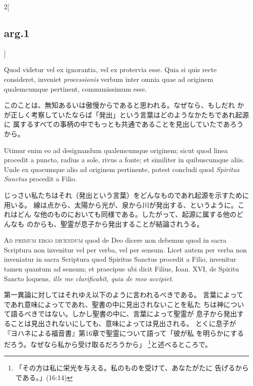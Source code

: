 \documentclass[paper=a4paper,fontsize=10pt,jafontsize=9pt,titlepage]{jlreq}
\begin{document}
\begin{paracol}{2}[\subsection{arg.1}]
\switchcolumn*

Quod videtur vel ex ignorantia, vel ex protervia
esse. Quia si quis recte consideret, inveniet {\itshape processionis} verbum
inter omnia quae ad originem qualemcumque pertinent, communissimum
esse.

\switchcolumn

このことは、無知あるいは傲慢からであると思われる。なぜなら、もしだれ
 かが正しく考察していたならば「発出」という言葉はどのようなかたちであれ起源に
 属するすべての事柄の中でもっとも共通であることを見出していたであろう
 から。

\switchcolumn*

Utimur enim eo ad designandum qualemcumque originem; sicut quod
linea procedit a puncto, radius a sole, rivus a fonte; et similiter in
quibuscumque aliis. Unde ex quocumque alio ad originem pertinente,
potest concludi quod {\itshape  Spiritus Sanctus} procedit a Filio.

\switchcolumn

じっさい私たちはそれ（発出という言葉）をどんなものであれ起源を示すために用いる。
 線は点から、太陽から光が、泉から川が発出する、というように。これはどん
 な他のものにおいても同様である。したがって、起源に属する他のどんなも
 のからも、聖霊が息子から発出することが結論されうる。

\switchcolumn*[\subsection{ad.1}]

{\scshape Ad primum ergo dicendum} quod de Deo dicere non debemus quod in sacra
Scriptura non invenitur vel per verba, vel per sensum. Licet autem per
verba non inveniatur in sacra Scriptura quod Spiritus
Sanctus procedit a Filio, invenitur tamen quantum ad sensum; et
praecipue ubi dicit Filius, Ioan. XVI, de  Spiritu Sancto loquens, {\itshape ille
me clarificabit, quia de meo accipiet}.

\switchcolumn

第一異論に対してはそれゆえ以下のように言われるべきである。
言葉によってであれ意味によってであれ、聖書の中に見出されないことを私た
 ちは神について語るべきではない。しかし聖書の中に、言葉によって聖霊が
 息子から発出することは見出されないにしても、意味によっては見出される。
 とくに息子が『ヨハネによる福音書』第16章で聖霊について語って「彼が私
 を明らかにするだろう。なぜなら私から受け取るだろうから」
 \footnote{「その方は私に栄光を与える。私のものを受けて、あなたがたに
 告げるからである。」(16:14)}と述べるところで。


\end{paracol}
\end{document}
